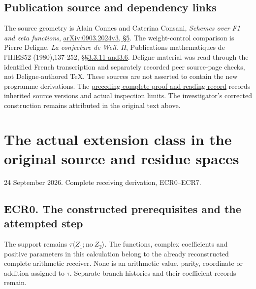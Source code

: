 \section{Publication source and dependency
links}\label{publication-source-and-dependency-links-1}

The source geometry is Alain Connes and Caterina Consani, \emph{Schemes
over F1 and zeta functions},
\href{https://arxiv.org/abs/0903.2024v3}{arXiv:0903.2024v3, §5}. The
weight-control comparison is Pierre Deligne, \emph{La conjecture de
Weil. II}, Publications mathematiques de l'IHES52 (1980),137-252,
\href{https://www.numdam.org/item/PMIHES_1980__52__137_0/}{§§3.3.11
and3.6}. Deligne material was read through the identified French
transcription and separately recorded peer source-page checks, not
Deligne-authored TeX. These sources are not asserted to contain the new
programme derivations. The
\href{https://github.com/KokunoYumeto/zeta-function-research-reader/blob/36a82ecca98addb8a98b48204e349737856c7223/workbenches/splitzero-tandem/continuations/20260924-cohomology-weight-and-character-lifts/BUILD_AND_REVIEW.md}{preceding
complete proof and reading record} records inherited source versions and
actual inspection limits. The investigator's corrected construction
remains attributed in the original text above.

\chapter{The actual extension class in the original source and residue
spaces}\label{the-actual-extension-class-in-the-original-source-and-residue-spaces}

24 September 2026. Complete receiving derivation, ECR0--ECR7.

\section{ECR0. The constructed prerequisites and the attempted
step}\label{ecr0.-the-constructed-prerequisites-and-the-attempted-step}

The support remains \(\tau\langle Z_1;\mathrm{no}\ Z_2\rangle\). The
functions, complex coefficients and positive parameters in this
calculation belong to the already reconstructed complete arithmetic
receiver. None is an arithmetic value, parity, coordinate or addition
assigned to \(\tau\). Separate branch histories and their coefficient
records remain.


